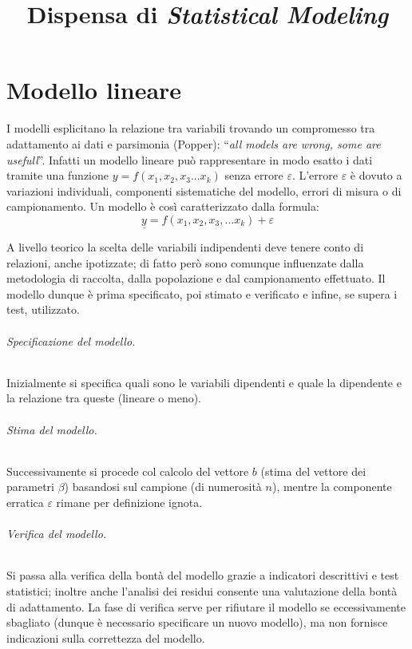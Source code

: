 \documentclass[11pt]{article}
\title{\textbf{Dispensa di \textit{Statistical Modeling}}}
\author{}
\date{}
\begin{document}
\maketitle
\part{Modello lineare}
I modelli esplicitano la relazione tra variabili trovando un compromesso tra adattamento ai dati e parsimonia (Popper): ``\textit{all models are wrong, some are usefull}''.
Infatti un modello lineare può rappresentare in modo esatto i dati tramite una funzione $y = f(x_1, x_2, x_3... x_k)$ senza errore $\varepsilon$.
L'errore $\varepsilon$ è dovuto a variazioni individuali, componenti sistematiche del modello, errori di misura o di campionamento.
Un modello è così caratterizzato dalla formula:
\begin{equation*}
  \underline{y} = f(x_1, x_2, x_3, ... x_k) + \varepsilon
\end{equation*}

A livello teorico la scelta delle variabili indipendenti deve tenere conto di relazioni, anche ipotizzate; di fatto però sono comunque influenzate dalla metodologia di raccolta, dalla popolazione e dal campionamento effettuato.
Il modello dunque è prima specificato, poi stimato e verificato e infine, se supera i test, utilizzato.

\paragraph{Specificazione del modello.}
Inizialmente si specifica quali sono le variabili dipendenti e quale la dipendente e la relazione tra queste (lineare o meno).

\paragraph{Stima del modello.}
Successivamente si procede col calcolo del vettore $b$ (stima del vettore dei parametri $\beta$) basandosi sul campione (di numerosità $n$), mentre la componente erratica $\varepsilon$ rimane per definizione ignota.

\paragraph{Verifica del modello.}
Si passa alla verifica della bontà del modello grazie a indicatori descrittivi e test statistici; inoltre anche l'analisi dei residui consente una valutazione della bontà di adattamento.
La fase di verifica serve per rifiutare il modello se eccessivamente sbagliato (dunque è necessario specificare un nuovo modello), ma non fornisce indicazioni sulla correttezza del modello. \newline
\end{document}
